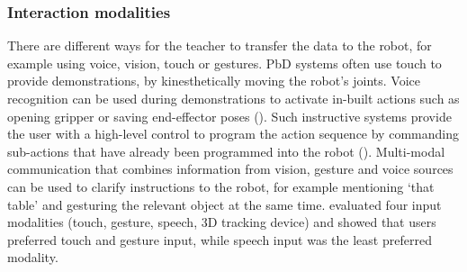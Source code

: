 \subsubsection{Interaction modalities}
There are different ways for the teacher to transfer the data to the robot, for example using voice, vision, touch or gestures.
PbD systems often use touch to provide demonstrations, \ie by kinesthetically moving the robot's joints.
Voice recognition can be used during demonstrations to activate in-built actions such as opening gripper or saving end-effector poses (\cite{alexandrova2014robot}).
Such instructive systems provide the user with a high-level control to program the action sequence by commanding sub-actions that have already been programmed into the robot (\cite{forbes2015robot}).
Multi-modal communication that combines information from vision, gesture and voice sources can be used to clarify instructions to the robot, for example mentioning `that table' and gesturing the relevant object at the same time. %
\cite{profanter2015analysis} evaluated four input modalities (touch, gesture, speech, 3D tracking device) and showed that users preferred touch and gesture input, while speech input was the least preferred modality.




